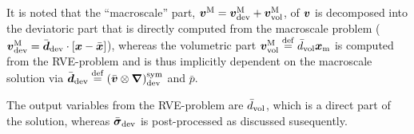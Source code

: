 \documentclass[10pt,a4paper]{article}
\newcommand{\particle}{\mathrm{part}}
\newcommand{\segment}{\mathrm{segm}}
\newcommand{\corner}{\mathrm{corn}}
\begin{document}

It is noted that the ``macroscale'' part, $\boldsymbol{v}^{\mathrm{M}}=\boldsymbol{v}^{\mathrm{M}}_{\mathrm{dev}}+\boldsymbol{v}^{\mathrm{M}}_{\mathrm{vol}}$, of $\boldsymbol{v}$ is decomposed into the deviatoric part that is directly computed from the macroscale problem ($\boldsymbol{v}^{\mathrm{M}}_{\mathrm{dev}}=\bar{\boldsymbol{d}}_{\mathrm{dev}}\cdot[\boldsymbol{x}-\bar{\boldsymbol{x}}]$), whereas the volumetric part $\boldsymbol{v}^{\mathrm{M}}_{\mathrm{vol}}\overset{\mathrm{def}}{=}\bar{d}_{\mathrm{vol}}\boldsymbol{x}_{\mathrm{m}}$ is computed from the RVE-problem and is thus implicitly dependent on the macroscale solution via $\bar{\boldsymbol{d}}_{\mathrm{dev}}\overset{\mathrm{def}}{=}(\bar{\boldsymbol{v}}\mathbin{\otimes}\boldsymbol{\nabla})^{\mathrm{sym}}_{\mathrm{dev}}$ and $\bar{p}$.

The output variables from the RVE-problem are $\bar{d}_{\mathrm{vol}}$, which is a direct part of the solution, whereas $\bar{\boldsymbol{\sigma}}_{\mathrm{dev}}$ is post-processed as discussed susequently.
\end{document}
